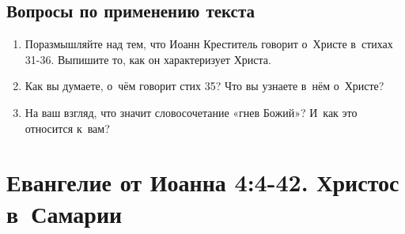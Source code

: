 \documentclass[a4paper,12pt]{article}
\begin{document}
\subsection*{Вопросы по применению текста} 
\begin{enumerate}
    \item Поразмышляйте над тем, что Иоанн Креститель говорит о~Христе в~стихах 31-36. Выпишите то, как он характеризует Христа. 
    
    \myline
    
    \myline
    \item Как вы думаете, о~чём говорит стих 35? Что вы узнаете в~нём о~Христе? 
    
    \myline
    
    \myline
    \item На ваш взгляд, что значит словосочетание «гнев Божий»? И~как это относится к~вам?
    
    \myline
    
    \myline
\end{enumerate}



\section{Евангелие от Иоанна 4:4-42. Христос в~Самарии}
\end{document}
